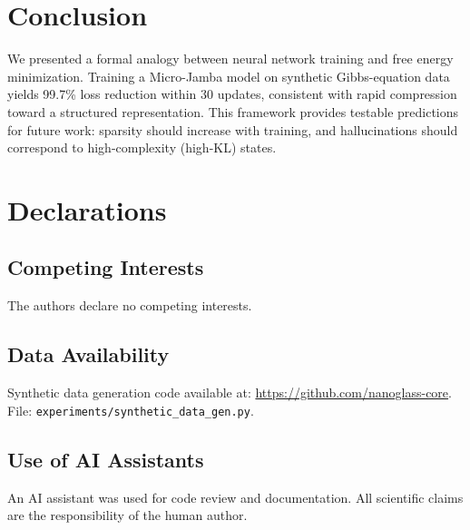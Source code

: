 \documentclass{article}
\begin{document}
\section{Conclusion}
We presented a formal analogy between neural network training and free energy minimization. Training a Micro-Jamba model on synthetic Gibbs-equation data yields 99.7\% loss reduction within 30 updates, consistent with rapid compression toward a structured representation. This framework provides testable predictions for future work: sparsity should increase with training, and hallucinations should correspond to high-complexity (high-KL) states.

\section*{Declarations}

\subsection*{Competing Interests}
The authors declare no competing interests.

\subsection*{Data Availability}
Synthetic data generation code available at: \url{https://github.com/nanoglass-core}. File: \texttt{experiments/synthetic\_data\_gen.py}.

\subsection*{Use of AI Assistants}
An AI assistant was used for code review and documentation. All scientific claims are the responsibility of the human author.

\printbibliography
\end{document}
